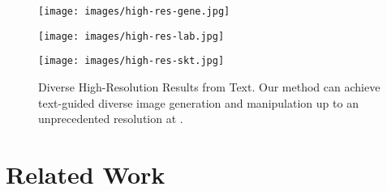 \documentclass[final]{cvpr}
\begin{document}
\begin{figure*}[th]
\centering
\begin{minipage}[t]{0.33\textwidth}
\centering
\texttt{[image: images/high-res-gene.jpg]}\\
\vspace{-5.0pt}\fontsize{7.0pt}{\baselineskip}
\end{minipage}
\begin{minipage}[t]{0.33\textwidth}
\centering
\texttt{[image: images/high-res-lab.jpg]}\\ 
\vspace{-5.0pt}\fontsize{7.0pt}{\baselineskip}
\end{minipage}
\begin{minipage}[t]{0.33\textwidth}
\centering
\texttt{[image: images/high-res-skt.jpg]}\\
\vspace{-5.0pt}\fontsize{7.0pt}{\baselineskip}
\end{minipage}
\caption{Diverse High-Resolution Results from Text. 
Our method can achieve text-guided diverse image generation and manipulation up to an unprecedented resolution at .}
\label{fig:high-res-gene}
\end{figure*}


\section{Related Work}
\label{sec:related_work}
\end{document}
